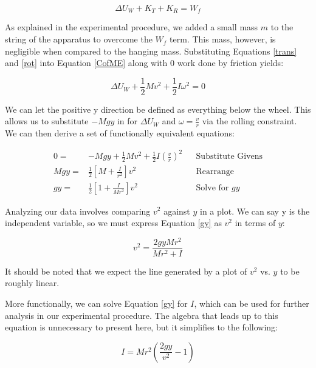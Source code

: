 \documentclass[12pt]{article}
\begin{document}
\begin{equation}
    \Delta U_W+K_T+K_R=W_f \label{CofME}
\end{equation}

\indent As explained in the experimental procedure, we added a small mass $m$ to the string of the apparatus to overcome the $W_f$ term. This mass, however, is negligible when compared to the hanging mass. Substituting Equations \ref{trans} and \ref{rot} into Equation \ref{CofME} along with 0 work done by friction yields:

\begin{equation}
    \Delta U_W+\frac{1}{2}Mv^2+\frac{1}{2}I\omega^2=0
\end{equation}

\indent We can let the positive y direction be defined as everything below the wheel. This allows us to substitute $-Mgy$ in for $\Delta U_W$ and $\omega = \frac{v}{r}$ via the rolling constraint. We can then derive a set of functionally equivalent equations:

\begin{align}
    0=&-Mgy+\frac{1}{2}Mv^2+\frac{1}{2}I(\frac{v}{r})^2 && \text{Substitute Givens} \label{substitute} \\
    Mgy=&\frac{1}{2}[M+\frac{I}{r^2}]v^2 && \text{Rearrange} \label{rearrange} \\
    gy=&\frac{1}{2}[1+\frac{I}{Mr^2}]v^2 \label{gy} && \text{Solve for }gy
\end{align}

\indent Analyzing our data involves comparing $v^2$ against $y$ in a plot. We can say y is the independent variable, so we must express Equation \ref{gy} as $v^2$ in terms of $y$:

\begin{equation}
    v^2 = \frac{2gyMr^2}{Mr^2+I} \label{slope}
\end{equation}

\noindent It should be noted that we expect the line generated by a plot of $v^2$ vs. $y$ to be roughly linear.

\indent More functionally, we can solve Equation \ref{gy} for $I$, which can be used for further analysis in our experimental procedure. The algebra that leads up to this equation is unnecessary to present here, but it simplifies to the following:

\begin{equation}
    I=Mr^2(\frac{2gy}{v^2}-1) \label{I of CofME}
\end{equation}
\end{document}
